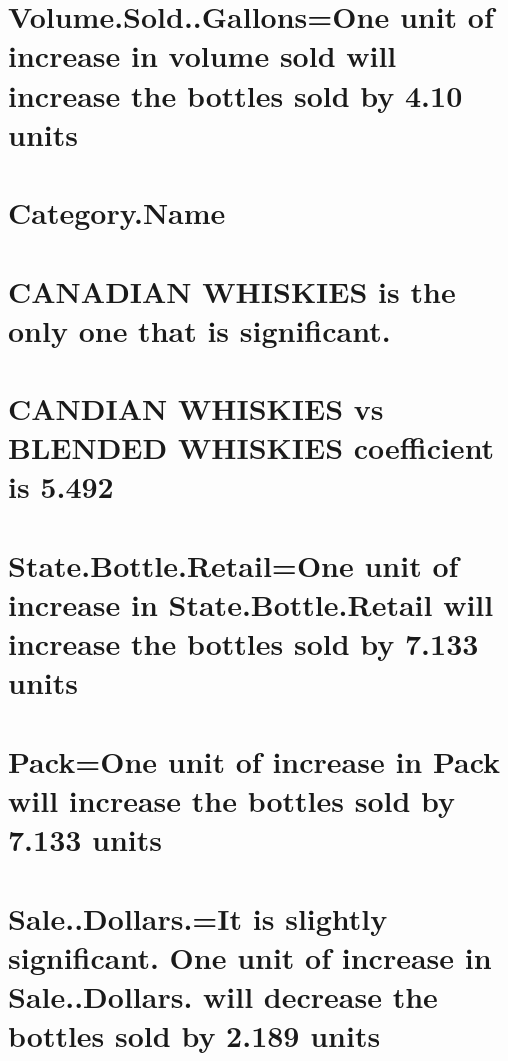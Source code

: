 \documentclass[]{elsarticle} %
\begin{document}
\section{Volume.Sold..Gallons=One unit of increase in volume sold will
increase the bottles sold by 4.10
units}\label{volume.sold..gallonsone-unit-of-increase-in-volume-sold-will-increase-the-bottles-sold-by-4.10-units}

\section{Category.Name}\label{category.name}

\section{CANADIAN WHISKIES is the only one that is
significant.}\label{canadian-whiskies-is-the-only-one-that-is-significant.}

\section{CANDIAN WHISKIES vs BLENDED WHISKIES coefficient is
5.492}\label{candian-whiskies-vs-blended-whiskies-coefficient-is-5.492}

\section{State.Bottle.Retail=One unit of increase in State.Bottle.Retail
will increase the bottles sold by 7.133
units}\label{state.bottle.retailone-unit-of-increase-in-state.bottle.retail-will-increase-the-bottles-sold-by-7.133-units}

\section{Pack=One unit of increase in Pack will increase the bottles
sold by 7.133
units}\label{packone-unit-of-increase-in-pack-will-increase-the-bottles-sold-by-7.133-units}

\section{Sale..Dollars.=It is slightly significant. One unit of increase
in Sale..Dollars. will decrease the bottles sold by 2.189
units}\label{sale..dollars.it-is-slightly-significant.-one-unit-of-increase-in-sale..dollars.-will-decrease-the-bottles-sold-by-2.189-units}
\end{document}
